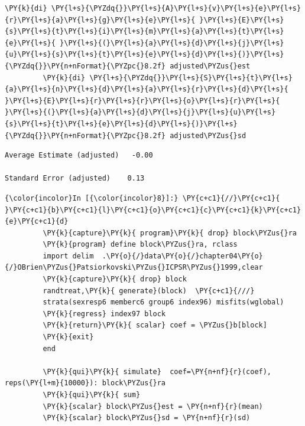 \documentclass[11pt,notitlepage]{article}\usepackage[]{graphicx}\usepackage[]{color}
\makeatletter
\newenvironment{kframe}{%
 \def\at@end@of@kframe{}%
 \ifinner\ifhmode%
  \def\at@end@of@kframe{\end{minipage}}%
  \begin{minipage}{\columnwidth}%
 \fi\fi%
 \def\FrameCommand##1{\hskip\@totalleftmargin \hskip-\fboxsep
 \colorbox{shadecolor}{##1}\hskip-\fboxsep
     \hskip-\linewidth \hskip-\@totalleftmargin \hskip\columnwidth}%
 \MakeFramed {\advance\hsize-\width
   \@totalleftmargin\z@ \linewidth\hsize
   \@setminipage}}%
 {\par\unskip\endMakeFramed%
 \at@end@of@kframe}
\newenvironment{knitrout}{}{} %
\makeatother
\begin{document}
\begin{enumerate}[a)]
\begin{knitrout}
\begin{kframe}
\begin{Verbatim}[commandchars=\\\{\}]
         \PY{k}{di} \PY{l+s}{\PYZdq{}}\PY{l+s}{A}\PY{l+s}{v}\PY{l+s}{e}\PY{l+s}{r}\PY{l+s}{a}\PY{l+s}{g}\PY{l+s}{e}\PY{l+s}{ }\PY{l+s}{E}\PY{l+s}{s}\PY{l+s}{t}\PY{l+s}{i}\PY{l+s}{m}\PY{l+s}{a}\PY{l+s}{t}\PY{l+s}{e}\PY{l+s}{ }\PY{l+s}{(}\PY{l+s}{a}\PY{l+s}{d}\PY{l+s}{j}\PY{l+s}{u}\PY{l+s}{s}\PY{l+s}{t}\PY{l+s}{e}\PY{l+s}{d}\PY{l+s}{)}\PY{l+s}{\PYZdq{}}\PY{n+nFormat}{\PYZpc{}8.2f} adjusted\PYZus{}est
         \PY{k}{di} \PY{l+s}{\PYZdq{}}\PY{l+s}{S}\PY{l+s}{t}\PY{l+s}{a}\PY{l+s}{n}\PY{l+s}{d}\PY{l+s}{a}\PY{l+s}{r}\PY{l+s}{d}\PY{l+s}{ }\PY{l+s}{E}\PY{l+s}{r}\PY{l+s}{r}\PY{l+s}{o}\PY{l+s}{r}\PY{l+s}{ }\PY{l+s}{(}\PY{l+s}{a}\PY{l+s}{d}\PY{l+s}{j}\PY{l+s}{u}\PY{l+s}{s}\PY{l+s}{t}\PY{l+s}{e}\PY{l+s}{d}\PY{l+s}{)}\PY{l+s}{\PYZdq{}}\PY{n+nFormat}{\PYZpc{}8.2f} adjusted\PYZus{}sd
\end{Verbatim}

    \begin{Verbatim}[commandchars=\\\{\}]
Average Estimate (adjusted)   -0.00

Standard Error (adjusted)    0.13

    \end{Verbatim}

    \begin{Verbatim}[commandchars=\\\{\}]
{\color{incolor}In [{\color{incolor}8}]:} \PY{c+c1}{//}\PY{c+c1}{ }\PY{c+c1}{b}\PY{c+c1}{l}\PY{c+c1}{o}\PY{c+c1}{c}\PY{c+c1}{k}\PY{c+c1}{e}\PY{c+c1}{d}
         \PY{k}{capture}\PY{k}{ program}\PY{k}{ drop} block\PYZus{}ra
         \PY{k}{program} define block\PYZus{}ra, rclass
         import delim  .\PY{o}{/}data\PY{o}{/}chapter04\PY{o}{/}OBrien\PYZus{}Patsiorkovski\PYZus{}ICPSR\PYZus{}1999,clear
         \PY{k}{capture}\PY{k}{ drop} block
         randtreat,\PY{k}{ generate}(block)  \PY{c+c1}{///}
         strata(sexresp6 memberc6 group6 index96) misfits(wglobal)
         \PY{k}{regress} index97 block
         \PY{k}{return}\PY{k}{ scalar} coef = \PYZus{}b[block]
         \PY{k}{exit}
         end
                
         \PY{k}{qui}\PY{k}{ simulate}  coef=\PY{n+nf}{r}(coef), reps(\PY{l+m}{10000}): block\PYZus{}ra
         \PY{k}{qui}\PY{k}{ sum}
         \PY{k}{scalar} block\PYZus{}est = \PY{n+nf}{r}(mean)
         \PY{k}{scalar} block\PYZus{}sd = \PY{n+nf}{r}(sd)
         

\end{Verbatim}
\end{kframe}
\end{knitrout}
\end{enumerate}
\end{document}
